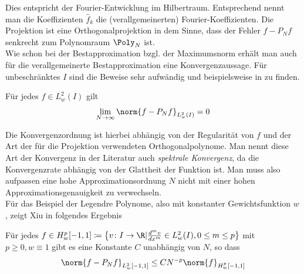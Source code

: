 Dies entspricht der Fourier-Entwicklung im Hilbertraum. Entsprechend nennt man die Koeffizienten $\hat{f}_k$ die (verallgemeinerten) Fourier-Koeffizienten. Die Projektion ist eine Orthogonalprojektion in dem Sinne, dass der Fehler $f-P_Nf$ senkrecht zum Polynomraum $\Poly_N$ ist.\\
Wie schon bei der Bestapproximation bzgl. der Maximumsnorm erhält man auch für die verallgemeinerte Bestapproximation eine Konvergenzaussage. Für unbeschränktes $I$ sind die Beweise sehr aufwändig und beispielsweise in \autocite{CouHil53} zu finden. 
\begin{maththeorem}
Für jedes $f\in L_w^2(I)$ gilt
\[\lim\limits_{N\to\infty}\norm{f-P_Nf}_{L_w^2(I)}=0\]
\end{maththeorem}
Die Konvergenzordnung ist hierbei abhängig von der Regularität von $f$ und der Art der für die Projektion verwendeten Orthogonalpolynome. Man nennt diese Art der Konvergenz in der Literatur auch \emph{spektrale Konvergenz}, da die Konvergenzrate abhängig von der Glattheit der Funktion ist. Man muss also aufpassen eine hohe Approximationsordnung $N$ nicht mit einer hohen Approximationsgenauigkeit zu verwechseln.\\
Für das Beispiel der Legendre Polynome, also mit konstanter Gewichtsfunktion $w$, zeigt Xiu in \autocite[Theorem 3.6]{dongbinxiu2010} folgendes Ergebnis
\begin{maththeorem}
\label{spectralconvth}
Für jedes $f\in H_w^p[-1,1]\coloneqq \left\lbrace v\colon I\to\R | \frac{d^mv}{dx^m}\in L_w^2(I),0\le m\le p\right\rbrace$ mit $p\ge 0, w\equiv 1$ gibt es eine Konstante $C$ unabhängig von $N$, so dass
\[\norm{f-P_Nf}_{L_w^2[-1,1]}\le CN^{-p}\norm{f}_{H_w^p[-1,1]}\]
\end{maththeorem}
